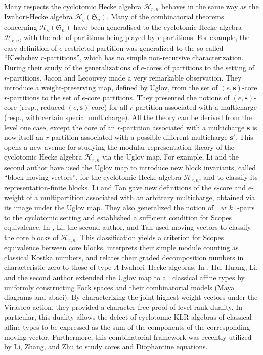 \documentclass[a4paper,10pt]{amsart}
\theoremstyle{plain}
\renewcommand{\H}{\mathcal{H}}
\def\bs{{\boldsymbol{s}}}
\def\Sym{\mathfrak{S}}
\theoremstyle{plain}
\numberwithin{equation}{section}
\begin{document}
Many respects the cyclotomic Hecke algebra $\H_{r,n}$ behaves in the same way as the Iwahori-Hecke algebra $\H_q(\Sym_n)$. Many of the combinatorial theorems concerning $\H_q(\Sym_n)$ have been generalised to the cyclotomic Hecke algebra $\H_{r,n}$, with the role of partitions being played by $r$-partitions. For example, the easy definition of $e$-restricted partition was generalized to the so-called ``Kleshchev $r$-partitions'', which has no simple non-recursive characterization. During their study of the generalizations of $e$-cores of partitions to the setting of $r$-partitions. Jacon and Lecouvey \cite{JL} made a very remarkable observation. They introduce a weight-preserving map, defined by Uglov, from the set of $(e,\bs)$-core $r$-partitions to the set of $e$-core partitions. They presented the notions of $(e,\bs)$-core (resp., reduced $(e,\bs)$-core) for all $r$-partition associated with a multicharge (resp., with certain special multicharge). All the theory can be derived from the level one case, except the core of an $r$-partition associated with a multicharge $\bs$ is now itself an $r$-partition associated with a possible different multicharge $\bs'$. This opens a new avenue for studying the modular representation theory of the cyclotomic Hecke algebra $\H_{r,n}$ via the Uglov map. For example, Li and the second author \cite{LQ2025} have used the Uglov map to introduce  new block invariants, called ``block moving vectors'', for the cyclotomic Hecke algebra $\H_{r,n}$, and to classify its representation-finite blocks. Li and Tan \cite{LT} gave new definitions of the $e$-core and $e$-weight of a multipartition associated with an arbitrary multicharge, obtained via its image under the Uglov map. They also generalized the notion of $[w:k]$-pairs to the cyclotomic setting and established a sufficient condition for Scopes equivalence. In \cite{LQT2026}, Li, the second author, and Tan used moving vectors to classify the core blocks of $\H_{r,n}$. This classification yields a criterion for Scopes equivalence between core blocks, interprets their simple module counting as classical Kostka numbers, and relates their graded decomposition numbers in characteristic zero to those of type $A$ Iwahori--Hecke algebras. In \cite{HHLQ}, Hu, Huang, Li, and the second author extended the Uglov map to all classical affine types by uniformly constructing Fock spaces and their combinatorial models (Maya diagrams and abaci). By characterizing the joint highest weight vectors under the Virasoro action, they provided a character-free proof of level-rank duality. In particular, this duality allows the defect of cyclotomic KLR algebras of classical affine types to be expressed as the sum of the components of the corresponding moving vector. Furthermore, this combinatorial framework was recently utilized by Li, Zhang, and Zhu \cite{LZZ} to study cores and Diophantine equations.
\end{document}
